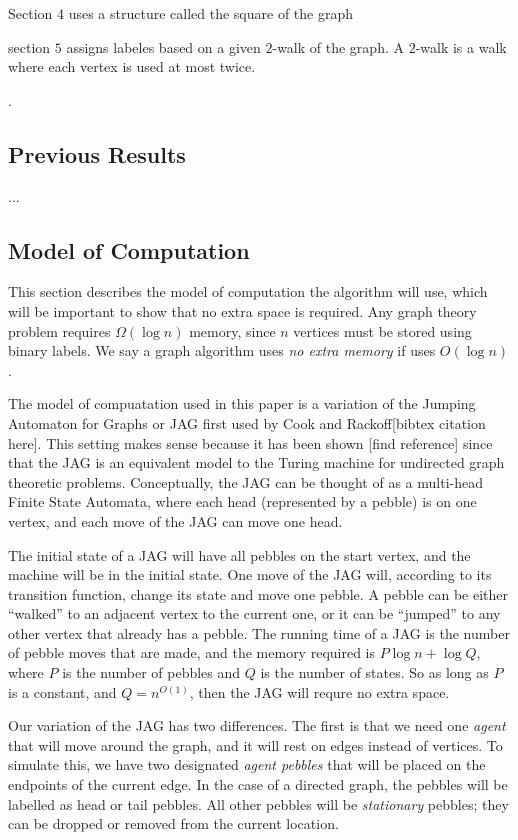 \documentclass[11pt]{article}
\begin{document}
Section $4$ uses a structure called the square of the graph


section $5$ assigns labeles based on a given $2$-walk of the graph.  A $2$-walk is a walk where each vertex is used 
at most twice.

.  

\subsection{Previous Results}
\label{ss-pr}
...

\subsection{Model of Computation}
\label{ss-moc}

This section describes the model of computation the algorithm will use, which will be important 
to show that no extra space is required.  Any graph theory problem requires $\Omega(\log n)$ memory, 
since $n$ vertices must be stored using binary labels.  We say a graph algorithm uses \emph{no extra memory} if uses 
$O(\log n)$.  

The model of compuatation used in this paper is a variation of the Jumping 
Automaton for Graphs or JAG first used by Cook and Rackoff[bibtex citation here].  This setting makes 
sense because it has been shown [find reference] since that the JAG is an equivalent model to the Turing 
machine for undirected graph theoretic problems.  Conceptually, 
the JAG can be thought of as a multi-head Finite State Automata, 
where each head (represented by a pebble) is on one vertex, and each move of the JAG can move one head.  

The initial state of a JAG will have all pebbles on the start vertex, and the machine 
will be in the initial state.  One move of the JAG will, according to 
its transition function, change its state and move one pebble.  
A pebble can be either ``walked'' to an adjacent vertex 
to the current one, or it can be ``jumped'' to any other vertex that already has a pebble.  The running 
time of a JAG is the number of pebble moves that are made, and the memory required is $P \log n+\log Q$, 
where $P$ is the number of pebbles and $Q$ is the number of states.  So as long as $P$ is a constant, 
and $Q = n^{O(1)}$, then the JAG will requre no extra space.  

Our variation of the JAG has two differences.  The first is that we need one \emph{agent} that will move 
around the graph, and it will rest on edges instead 
of vertices.  To simulate this, we have two designated \emph{agent pebbles} that will be placed on the endpoints of the 
current edge.  In the case of a directed graph, the pebbles will be labelled as head or tail pebbles.  All other pebbles 
will be \emph{stationary} pebbles; they can be dropped or removed from the current location.  
\end{document}
